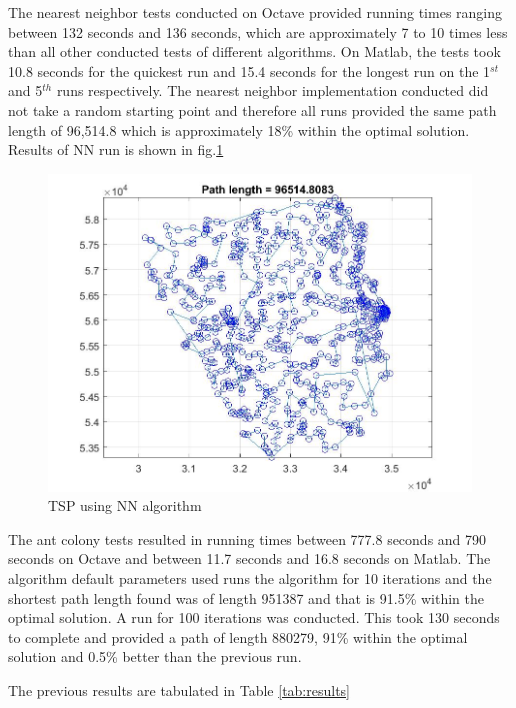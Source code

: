 \documentclass[twocolumn]{article}
\begin{document}
	The nearest neighbor tests conducted on Octave provided running times ranging between 132 seconds and 136 seconds, which are approximately 7 to 10 times less than all other conducted tests of different algorithms. On Matlab, the tests took 10.8 seconds for the quickest run and 15.4 seconds for the longest run on the 1$^{st}$ and 5$^{th}$ runs respectively. The nearest neighbor implementation conducted did not take a random starting point and therefore all runs provided the same path length of 96,514.8 which is approximately 18\%  within the optimal solution. Results of NN run is shown in fig.\ref{fig:NNalgorithm}
	
	\begin{figure}[h!]
		\centering
		\includegraphics[scale=0.25]{./NN.jpg}
		\caption{TSP using NN algorithm}
		\label{fig:NNalgorithm}
	\end{figure}
	
	The ant colony tests resulted in running times between 777.8 seconds and 790 seconds on Octave and between 11.7 seconds and 16.8 seconds on Matlab. The algorithm default parameters used runs the algorithm for 10 iterations and the shortest path length found was of length 951387 and that is 91.5\% within the optimal solution. A run for 100 iterations was conducted. This took 130 seconds to complete and provided a path of length 880279, 91\% within the optimal solution and 0.5\% better than the previous run.
	
	The previous results are tabulated in Table \ref{tab:results}
	
\end{document}
